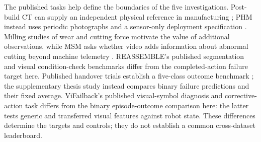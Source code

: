 The published tasks help define the boundaries of the five investigations.
Post-build CT can supply an independent physical reference in manufacturing
\parencite{Petrich2021Multimodal}; PHM instead uses periodic photographs and a
sensor-only deployment specification \parencite{PHM2026Challenge}. Milling studies
of wear and cutting force \parencites[Tables~IV--V]{P021}[Table~1]{P045}
motivate the value of additional
observations, while MSM asks whether video adds information about abnormal cutting
beyond machine telemetry \parencite{Kim2026MSM}. REASSEMBLE's published segmentation
and visual condition-check benchmarks \parencite{Sliwowski2025REASSEMBLE} differ
from the completed-action failure target here. Published handover trials establish
a five-class outcome benchmark \parencite{Thoduka2024Handover}; the supplementary
thesis study instead compares binary failure predictions and their fixed average.
ViFailback's published visual-symbol diagnosis and corrective-action task
\parencite[Tables~2--4]{Zeng2026ViFailback} differs from the binary episode-outcome comparison
here: the latter tests generic and transferred visual features against robot state.
These differences determine the targets and controls; they do not establish a
common cross-dataset leaderboard.

